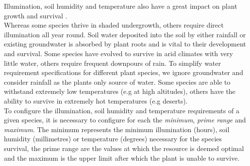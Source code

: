 Illumination, soil humidity and temperature also have a great impact on plant growth and survival \cite{Fourcaud2008}.\\
Whereas some species thrive in shaded undergrowth, others require direct illumination all year round. Soil water deposited into the soil by either rainfall or existing groundwater is absorbed by plant roots and is vital to their development and survival. Some species have evolved to survive in arid climates with very little water, others require frequent downpours of rain. To simplify water requirement specifications for different plant species, we ignore groundwater and consider rainfall as the plants only source of water. Some species are able to withstand extremely low temperatures (e.g at high altitudes), others have the ability to survive in extremely hot temperatures (e.g deserts).\\
To configure the illumination, soil humidity and temperature requirements of a given species, it is necessary to configure for each the \textit{minimum}, \textit{prime range} and \textit{maximum}. The minimum represents the minimum illumination (hours), soil humidity (millimetres) or temperature (degrees) necessary for the species survival, the prime range are the values at which the resource is deemed optimal and the maximum is the upper limit after which the plant is unable to survive.

